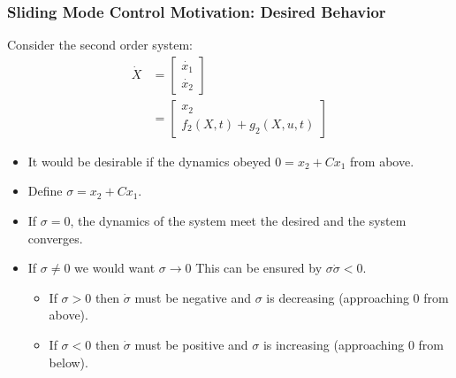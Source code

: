 \documentclass[aspectratio=169]{beamer}
\begin{document}
\begin{frame}
    \frametitle{Sliding Mode Control Motivation: Desired Behavior}
    
    Consider the second order system:
    \begin{align*}
    \dot{X}&=
    \begin{bmatrix}
    \dot{x_1}\\
    \dot{x_2}
    \end{bmatrix}\\
    &=
    \begin{bmatrix}
    x_2\\
    f_2(X,t)+g_2(X,u,t)
    \end{bmatrix}
    \end{align*}
    \begin{itemize}
    \item It would be desirable if the dynamics obeyed $0=x_2+Cx_1$ from above.
    \item Define $\sigma=x_2+Cx_1$.
    
    \item If $\sigma=0$, the dynamics of the system meet the desired and the system converges.
    \item If $\sigma\neq0$ we would want $\sigma\to0$
    This can be ensured by $\sigma\dot{\sigma}<0$.
    \begin{itemize}
    \item If $\sigma>0$ then $\dot{\sigma}$ must be negative and $\sigma$ is decreasing (approaching 0 from above).
    \item If $\sigma<0$ then $\dot{\sigma}$ must be positive and $\sigma$ is increasing (approaching 0 from below).
    \end{itemize}

    \end{itemize}
\end{frame}
\end{document}
